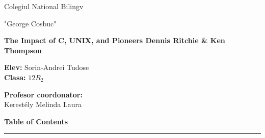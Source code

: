 \documentclass[12pt]{article}
\begin{document}
\thispagestyle{empty}   %
\begin{center}
    \vspace*{\fill}     %

    \huge Colegiul National Bilingv
    
    \huge "George Cosbuc"
    
    \vspace{4cm}
    
    \textbf{\Huge The Impact of C, UNIX, and Pioneers Dennis Ritchie \& Ken Thompson}
    
    \vspace{10cm}

     \begin{minipage}[t]{0.5\textwidth}
        \Large \textbf{Elev:}
        \large Sorin-Andrei Tudose \\
        \Large \textbf{Clasa:}
        \Large $12R_2$
    \end{minipage}%
    \begin{minipage}[t]{0.5\textwidth}
        \raggedleft
        \Large \textbf{Profesor coordonator:} \\
        \large Kerestély Melinda Laura
    \end{minipage}
    
    \vspace*{\fill}     %
\end{center}

    
\newpage
\begin{center}
    \vspace*{\fill}     %
    \Huge\textbf{Table of Contents}
    \par\noindent\rule{\textwidth}{0.4pt}
    \small\tableofcontents
    \vspace*{\fill}     %
\end{center}

\newpage
\end{document}

